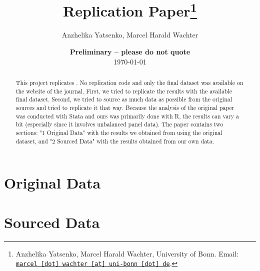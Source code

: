 \documentclass[11pt, a4paper, leqno]{article}
\begin{document}
\title{Replication Paper\thanks{Anzhelika Yatsenko, Marcel Harald Wachter, University of Bonn. Email: \href{mailto:marcel.wachter@uni-bonn.de}{\nolinkurl{marcel [dot] wachter [at] uni-bonn [dot] de}}.}}

\author{Anzhelika Yatsenko, Marcel Harald Wachter}

\date{
    {\bf Preliminary -- please do not quote}
    \\[1ex]
    \today
}

\maketitle


\begin{abstract}
    This project replicates \citep{Rose2004}. No replication code and only the final dataset was available on the website of the journal. First, we tried to replicate the results with the available final dataset. Second, we tried to source as much data as possible from the original sources and tried to replicate it that way. Because the analysis of the original paper was conducted with Stata and ours was primarily done with R, the results can vary a bit (especially since it involves unbalanced panel data). The paper contains two sections: "1 Original Data" with the results we obtained from using the original dataset, and "2 Sourced Data" with the results obtained from our own data.
\end{abstract}

\clearpage
\section{Original Data}









\clearpage
\section{Sourced Data}





%


 \clearpage

\printbibliography
{}


\end{document}
